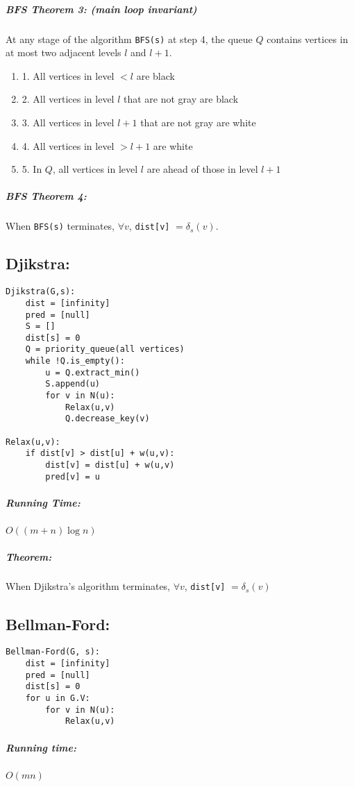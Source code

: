 \documentclass{article}
\newcommand{\code}[1]{\texttt{#1}}
\begin{document}
\subparagraph*{BFS Theorem 3: (main loop invariant)} At any stage of the algorithm \code{BFS(s)} at step 4, the queue \(Q\) contains vertices in at most two adjacent levels \(l\) and \(l+1\). \begin{enumerate}
    \item[] 1. All vertices in level \(< l\) are black
    \item[] 2. All vertices in level \(l\) that are not gray are black
    \item[] 3. All vertices in level \(l+1\) that are not gray are white
    \item[] 4. All vertices in level \(> l+1\) are white
    \item[] 5. In \(Q\), all vertices in level \(l\) are ahead of those in level \(l+1\)
\end{enumerate}

\subparagraph*{BFS Theorem 4:} When \code{BFS(s)} terminates, \(\forall v\), \code{dist[v]} \(= \delta_s(v)\).

\subsection*{Djikstra:}
\begin{lstlisting}
Djikstra(G,s):
    dist = [infinity]
    pred = [null]
    S = []
    dist[s] = 0
    Q = priority_queue(all vertices)
    while !Q.is_empty():
        u = Q.extract_min()
        S.append(u)
        for v in N(u):
            Relax(u,v)
            Q.decrease_key(v)
        
Relax(u,v):
    if dist[v] > dist[u] + w(u,v):
        dist[v] = dist[u] + w(u,v)
        pred[v] = u
\end{lstlisting}

\subparagraph*{Running Time:} \(O((m + n) \log n)\)

\subparagraph*{Theorem:} When Djikstra's algorithm terminates, \(\forall v\), \code{dist[v]} \(= \delta_s(v)\)

\subsection*{Bellman-Ford:}

\begin{lstlisting}
Bellman-Ford(G, s):
    dist = [infinity]
    pred = [null]
    dist[s] = 0
    for u in G.V:
        for v in N(u):
            Relax(u,v)
\end{lstlisting}

\subparagraph*{Running time:} \(O(mn)\)
\end{document}
